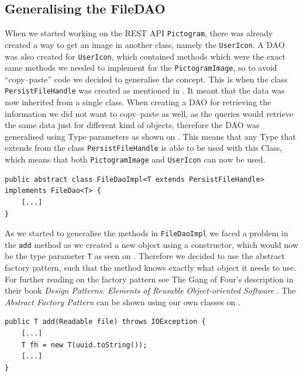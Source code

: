 \subsection{Generalising the FileDAO}\label{subsec:persistfilehandle}
When we started working on the REST API \texttt{Pictogram}, there was already created a way to get an image in another class, namely the \texttt{UserIcon}.
A DAO was also created for \texttt{UserIcon}, which contained methods which were the exact same methods we needed to implement for the \texttt{PictogramImage}, so to avoid \enquote{copy--paste} code we decided to generalise the concept.
This is when the class \texttt{PersistFileHandle} was created as mentioned in .
It meant that the data was now inherited from a single class.
When creating a DAO for retrieving the information we did not want to copy--paste as well, as the queries would retrieve the same data just for different kind of objects, therefore the DAO was generalised using Type parameters as shown on .
This means that any Type that extends from the class \texttt{PersistFileHandle} is able to be used with this Class, which means that both \texttt{PictogramImage} and \texttt{UserIcon} can now be used.

\begin{lstlisting}[float, floatplacement=h, caption={The \texttt{FileDaoImpl} class header which uses Type Parameters to generalise which types it can be used with. \texttt{[...]} denotes omitted code.},label={lst:typeparameter}]
public abstract class FileDaoImpl<T extends PersistFileHandle> implements FileDao<T> {
	[...]
}
\end{lstlisting}

As we started to generalise the methods in \texttt{FileDaoImpl} we faced a problem in the \texttt{add} method as we created a new object using a constructor, which would now be the type parameter \texttt{T} as seen on .
Therefore we decided to use the abstract factory pattern, such that the method knows exactly what object it needs to use.
For further reading on the factory pattern see The Gang of Four's description in their book \textit{Design Patterns: Elements of Reusable Object-oriented Software} \cite{abstractfactorypattern}.
The \textit{Abstract Factory Pattern} can be shown using our own classes on .

\begin{lstlisting}[float, floatplacement=h, caption={Trying to use a Type Parameter constructor, which Java cannot do. \texttt{[...]} denotes omitted code.},label={lst:TypeParameterConstructor}]
public T add(Readable file) throws IOException {
    [...]
    T fh = new T(uuid.toString());
    [...]
}
\end{lstlisting}

